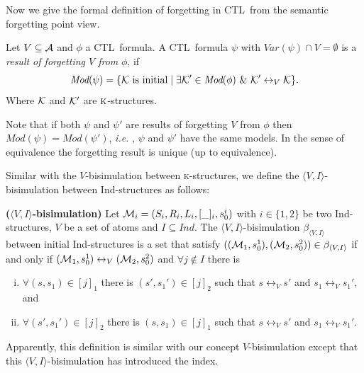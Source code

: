 \documentclass[runningheads]{llncs}
\newcommand{\tuple}[1]{{\langle{#1}\rangle}}
\newcommand{\Mod}{\textit{Mod}}
\newcommand\ie{{\it i.e. }}
\newcommand{\lrto}{\leftrightarrow}
\newcommand{\Var}{\textit{Var}}
\newcommand{\MPK}{\textsc{k}}
\newcommand{\Hm} {{\cal M}}
\newcommand{\CTL}{\textrm{CTL}}
\newcommand{\Ind}{\textrm{Ind}}
\begin{document}
Now we give the formal definition of forgetting in \CTL\ from the semantic forgetting point view.
\begin{definition}[Forgetting]\label{def:V:forgetting}
  Let $V\subseteq\cal A$ and $\phi$ a \CTL\ formula.
A \CTL\ formula $\psi$ with $\Var(\psi)\cap V=\emptyset$
is a {\em result of forgetting $V$ from} $\phi$, if
\begin{equation}
  \Mod(\psi)=\{{\cal K}\mbox{ is initial}\mid \exists {\cal K}'\in\Mod(\phi)\ \&\ {\cal K}'\lrto_V{\cal K}\}.
\end{equation}
Where $\cal K$ and ${\cal K}'$ are $\MPK$-structures.
\end{definition}
Note that if both $\psi$ and $\psi'$ are results of forgetting $V$ from $\phi$ then
$\Mod(\psi)=\Mod(\psi')$, \ie, $\psi$ and $\psi'$ have the same models. In the sense
of equivalence the forgetting result is unique (up to equivalence).


Similar with the $V$-bisimulation between \MPK-structures, we define the $\tuple{V,I}$-bisimulation between \Ind-structures as follows:
\begin{definition}\label{def:VInd:bisimulation}
\textbf{($\tuple{V,I}$-bisimulation)}
Let $\Hm_i=(S_i, R_i, L_i, [\_]_i, s_0^i)$ with $i\in \{1, 2\}$ be two \Ind-structures, $V$ be a set of atoms and $I \subseteq Ind$. The $\tuple{V,I}$-bisimulation $\beta_{\tuple{V,I}}$ between initial \Ind-structures is a set that satisfy $((\Hm_1, s_0^1), (\Hm_2, s_0^2)) \in \beta_{\tuple{V,I}}$  if and only if $(\Hm_1, s_0^1) \lrto_V (\Hm_2, s_0^2)$ and $\forall j \notin I$ there is
\begin{enumerate}[(i)]
  \item $\forall (s, s_1)\in [j]_1$ there is $(s',s_1')\in [j]_2$ such that $s\lrto_V s'$ and $s_1 \lrto_V s_1'$, and
  \item $\forall (s', s_1')\in [j]_2$ there is $(s,s_1)\in [j]_1$ such that $s\lrto_V s'$ and $s_1 \lrto_V s_1'$.
\end{enumerate}
\end{definition}
Apparently, this definition is similar with our concept $V$-bisimulation except that this $\tuple{V,I}$-bisimulation has introduced the index.
\end{document}
